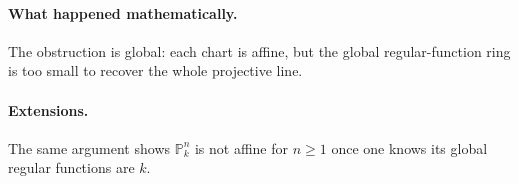 \paragraph{What happened mathematically.}
The obstruction is global: each chart is affine, but the global regular-function ring is too small to recover the whole projective line.

\paragraph{Extensions.}
The same argument shows $\mathbb P^n_k$ is not affine for $n\ge1$ once one knows its global regular functions are $k$.
\fi

